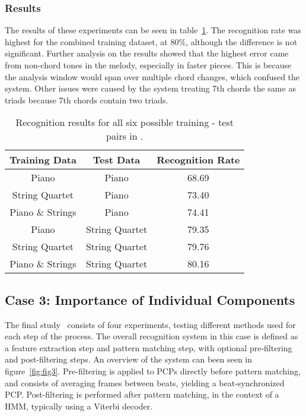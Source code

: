\documentclass{sig-alternate}
\begin{document}
\subsubsection{Results}

The results of these experiments can be seen in table~\ref{tab:tab5}. The recognition rate was highest for the combined training dataset, at 80\%, although the difference is not significant. Further analysis on the results showed that the highest error came from non-chord tones in the melody, especially in faster pieces. This is because the analysis window would span over multiple chord changes, which confused the system. Other issues were caused by the system treating 7th chords the same as triads because 7th chords contain two triads.

\begin{table}
\centering
\begin{tabular}{|c|c|c|} \hline
\textbf{Training Data} & \textbf{Test Data} & \textbf{Recognition Rate} \\ \hline
Piano & Piano & 68.69 \\ \hline
String Quartet & Piano & 73.40 \\ \hline
Piano \& Strings & Piano & 74.41 \\ \hline
Piano & String Quartet & 79.35 \\ \hline
String Quartet & String Quartet & 79.76 \\ \hline
Piano \& Strings & String Quartet & 80.16 \\ \hline
\end{tabular}
\caption{Recognition results for all six possible training - test pairs in \cite{Lee:2006}.}
\label{tab:tab5}
\end{table}

\subsection{Case 3: Importance of Individual Components}

The final study~\cite{TaeMin:2014} consists of four experiments, testing different methods used for each step of the process. The overall recognition system in this case is defined as a feature extraction step and pattern matching step, with optional pre-filtering and post-filtering steps. An overview of the system can been seen in figure~\ref{fig:fig3}.  Pre-filtering is applied to PCPs directly before pattern matching, and consists of averaging frames between beats, yielding a beat-synchronized PCP. Post-filtering is performed after pattern matching, in the context of a HMM, typically using a Viterbi decoder.
\end{document}
